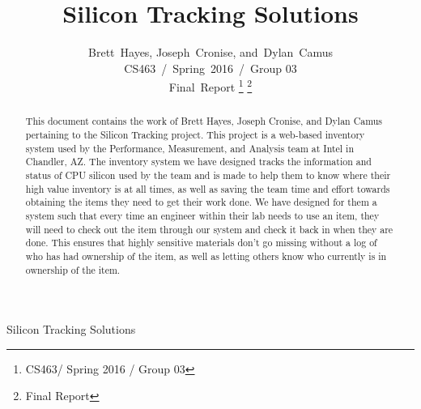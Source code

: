 \documentclass[10pt, onecolumn, twoside, peerreview]{IEEEtran}
\begin{document}
\title{Silicon Tracking Solutions}
%
%

\author{Brett~Hayes,
        Joseph~Cronise,
        and~Dylan~Camus\\%
        CS463~/~Spring~2016~/~Group 03\\%
        Final~Report
\thanks{CS463/ Spring 2016 / Group 03}%
\thanks{Final Report}}

%
{Silicon Tracking Solutions}

\maketitle

\begin{abstract}
This document contains the work of Brett Hayes, Joseph Cronise, and Dylan Camus pertaining to the Silicon Tracking
project. This project is a web-based inventory system used by the Performance, Measurement, and Analysis team at Intel
in Chandler, AZ. The inventory system we have designed tracks the information and status of CPU silicon used by the
team and is made to help them to know where their high value inventory is at all times, as well as saving the team time
and effort towards obtaining the items they need to get their work done. We have designed for them a system such that
every time an engineer within their lab needs to use an item, they will need to check out the item through our system
and check it back in when they are done. This ensures that highly sensitive materials don’t go missing without a log of
who has had ownership of the item, as well as letting others know who currently is in ownership of the item.
\end{abstract}

\IEEEpeerreviewmaketitle
\end{document}
